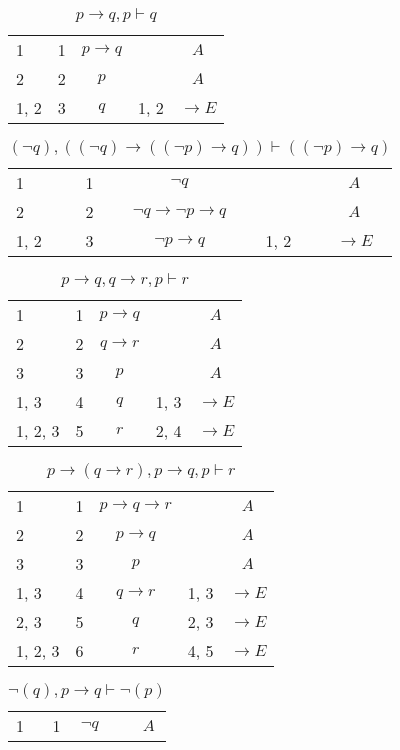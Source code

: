 \documentclass{article}
\begin{document}
\begin{table}[htbp]\caption*{$p→q,p ⊢ q$}\centering\begin{tabular}{lrlll}
{1} & 1 & $$p→q$$ & {} & $$A$$ \\
{2} & 2 & $$p$$ & {} & $$A$$ \\
{1, 2} & 3 & $$q$$ & {1, 2} & $$→E$$ \\
\end{tabular}
\end{table}\begin{table}[htbp]\caption*{$(¬q),((¬q)→((¬p)→q)) ⊢ ((¬p)→q)$}\centering\begin{tabular}{lrlll}
{1} & 1 & $$¬q$$ & {} & $$A$$ \\
{2} & 2 & $$¬q→ ¬p→q$$ & {} & $$A$$ \\
{1, 2} & 3 & $$¬p→q$$ & {1, 2} & $$→E$$ \\
\end{tabular}
\end{table}\begin{table}[htbp]\caption*{$p→q,q→r,p ⊢ r$}\centering\begin{tabular}{lrlll}
{1} & 1 & $$p→q$$ & {} & $$A$$ \\
{2} & 2 & $$q→r$$ & {} & $$A$$ \\
{3} & 3 & $$p$$ & {} & $$A$$ \\
{1, 3} & 4 & $$q$$ & {1, 3} & $$→E$$ \\
{1, 2, 3} & 5 & $$r$$ & {2, 4} & $$→E$$ \\
\end{tabular}
\end{table}\begin{table}[htbp]\caption*{$p→(q→r),p→q,p ⊢ r$}\centering\begin{tabular}{lrlll}
{1} & 1 & $$p→q→r$$ & {} & $$A$$ \\
{2} & 2 & $$p→q$$ & {} & $$A$$ \\
{3} & 3 & $$p$$ & {} & $$A$$ \\
{1, 3} & 4 & $$q→r$$ & {1, 3} & $$→E$$ \\
{2, 3} & 5 & $$q$$ & {2, 3} & $$→E$$ \\
{1, 2, 3} & 6 & $$r$$ & {4, 5} & $$→E$$ \\
\end{tabular}
\end{table}\begin{table}[htbp]\caption*{$¬(q),p→q ⊢ ¬(p)$}\centering\begin{tabular}{lrlll}
{1} & 1 & $$¬q$$ & {} & $$A$$ \\

\end{tabular}
\end{table}
\end{document}
